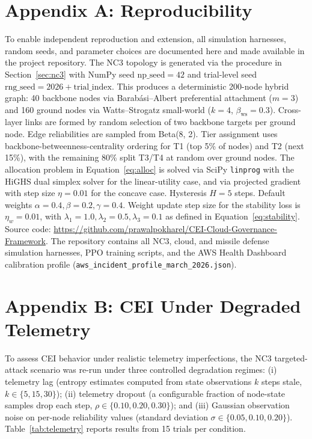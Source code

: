 \documentclass[runningheads]{llncs}
\begin{document}
\appendix

\section*{Appendix A: Reproducibility}
\label{app:reproducibility}

To enable independent reproduction and extension, all simulation harnesses, random seeds, and parameter choices are documented here and made available in the project repository. The NC3 topology is generated via the procedure in Section~\ref{sec:nc3} with NumPy seed $\text{np\_seed} = 42$ and trial-level seed $\text{rng\_seed} = 2026 + \text{trial\_index}$. This produces a deterministic 200-node hybrid graph: 40 backbone nodes via Barab\'{a}si--Albert preferential attachment ($m = 3$) and 160 ground nodes via Watts--Strogatz small-world ($k = 4$, $\beta_{\text{ws}} = 0.3$). Cross-layer links are formed by random selection of two backbone targets per ground node. Edge reliabilities are sampled from Beta(8, 2). Tier assignment uses backbone-betweenness-centrality ordering for T1 (top 5\% of nodes) and T2 (next 15\%), with the remaining 80\% split T3/T4 at random over ground nodes. The allocation problem in Equation~\ref{eq:alloc} is solved via SciPy \texttt{linprog} with the HiGHS dual simplex solver for the linear-utility case, and via projected gradient with step size $\eta = 0.01$ for the concave case. Hysteresis $H = 5$ steps. Default weights $\alpha = 0.4, \beta = 0.2, \gamma = 0.4$. Weight update step size for the stability loss is $\eta_w = 0.01$, with $\lambda_1 = 1.0, \lambda_2 = 0.5, \lambda_3 = 0.1$ as defined in Equation~\ref{eq:stability}. Source code: \url{https://github.com/prawalpokharel/CEI-Cloud-Governance-Framework}. The repository contains all NC3, cloud, and missile defense simulation harnesses, PPO training scripts, and the AWS Health Dashboard calibration profile (\texttt{aws\_incident\_profile\_march\_2026.json}).

\section*{Appendix B: CEI Under Degraded Telemetry}
\label{app:telemetry}

To assess CEI behavior under realistic telemetry imperfections, the NC3 targeted-attack scenario was re-run under three controlled degradation regimes: (i) telemetry lag (entropy estimates computed from state observations $k$ steps stale, $k \in \{5, 15, 30\}$); (ii) telemetry dropout (a configurable fraction of node-state samples drop each step, $\rho \in \{0.10, 0.20, 0.30\}$); and (iii) Gaussian observation noise on per-node reliability values (standard deviation $\sigma \in \{0.05, 0.10, 0.20\}$). Table~\ref{tab:telemetry} reports results from 15 trials per condition.
\end{document}
